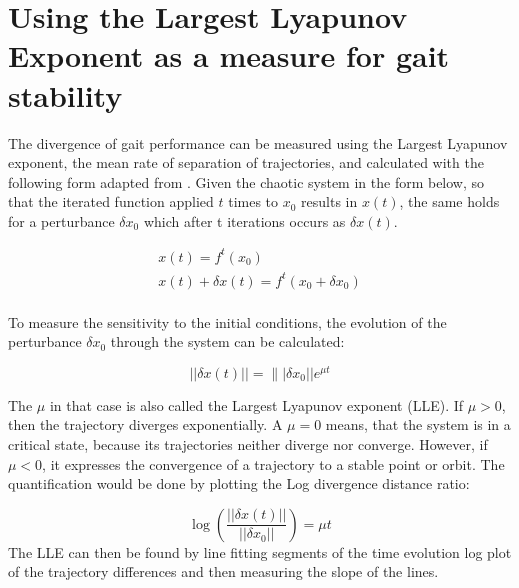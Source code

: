 \documentclass[main]{subfiles}
\begin{document}
\chapter{Using the Largest Lyapunov Exponent as a measure for gait stability} %

\label{AppendixA} %

The divergence of gait performance can be measured using the Largest Lyapunov exponent, the mean rate of separation of trajectories, and calculated with the following form adapted from \cite{bib:Rosenstein1993}. %
%
Given the chaotic system in the form below, so that the iterated function applied \(t\) times to \(x_0\) results in \(x(t)\), the same holds for a perturbance \(\delta x_0\) which after t iterations occurs as \(\delta x(t)\).

\begin{align*}
x(t) = f^t(x_0)\\
x(t) + \delta x(t) = f^t(x_0 + \delta x_0)\\
\end{align*}

To measure the sensitivity to the initial conditions, the evolution of the perturbance \(\delta x_0\) through the system can be calculated:

\[||\delta x(t)|| = \||\delta x_0|| e^{\mu t}\]

The \(\mu\) in that case is also called the Largest Lyapunov exponent (LLE). %
%
If \(\mu > 0\), then the trajectory diverges exponentially. %
%
A \(\mu = 0\) means, that the system is in a critical state, because its trajectories neither diverge nor converge. %
%
However, if \(\mu < 0\), it expresses the convergence of a trajectory to a stable point or orbit. %
%
The quantification would be done by plotting the Log divergence distance ratio:

\[\log\left(\frac{||\delta x(t)||}{||\delta x_0||}\right) = \mu t\]
%
The LLE can then be found by line fitting segments of the time evolution log plot of the trajectory differences and then measuring the slope of the lines. %
\end{document}
